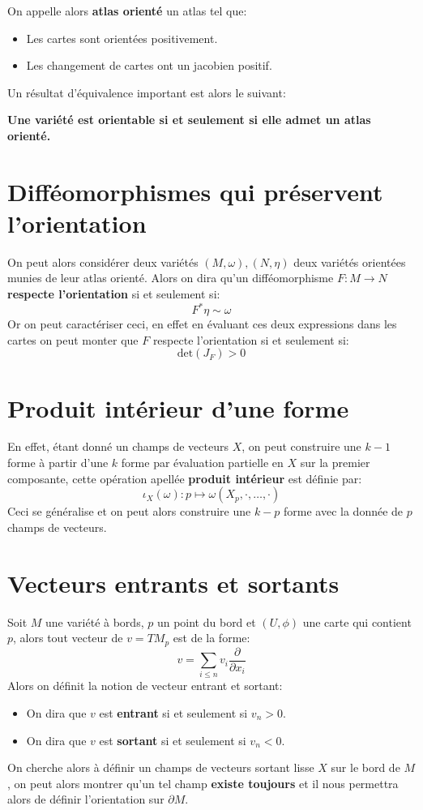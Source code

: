       On appelle alors \textbf{atlas orienté} un atlas tel que:
      \begin{itemize}
         \item Les cartes sont orientées positivement.
         \item Les changement de cartes ont un jacobien positif.
      \end{itemize}
      Un résultat d'équivalence important est alors le suivant:
      \begin{center}
         \textbf{Une variété est orientable si et seulement si elle admet un atlas orienté.}
      \end{center}
   
   
   
   \section{Difféomorphismes qui préservent l'orientation}
      On peut alors considérer deux variétés \( (M, \omega), (N, \eta) \) deux variétés orientées munies de leur atlas orienté. Alors on dira qu'un difféomorphisme \( F : M \longrightarrow N \) \textbf{respecte l'orientation} si et seulement si:
      \[ 
         F^*\eta \sim \omega
      \]
      Or on peut caractériser ceci, en effet en évaluant ces deux expressions dans les cartes on peut monter que \( F \) respecte l'orientation si et seulement si:
      \[ 
         \text{det}(J_F) > 0
      \]
   \section{Produit intérieur d'une forme}
         En effet, étant donné un champs de vecteurs \( X \), on peut construire une \( k-1 \) forme à partir d'une \( k \) forme par évaluation partielle en \( X \) sur la premier composante, cette opération apellée \textbf{produit intérieur} est définie par:
         \[ 
            \iota_X(\omega) : p \mapsto \omega(X_p, \cdot, \ldots, \cdot)
         \]
         Ceci se généralise et on peut alors construire une \( k-p \) forme avec la donnée de \( p \) champs de vecteurs.
   \section{Vecteurs entrants et sortants}
      Soit $M$ une variété à bords, $p$ un point du bord et $(U, \phi)$ une carte qui contient $p$, alors tout vecteur de $v = TM_p$ est de la forme:
      \[ 
         v = \sum_{i \leq n} v_i \frac{\partial}{\partial x_i}
      \]
      Alors on définit la notion de vecteur entrant et sortant:
      \begin{itemize}
         \item On dira que $v$ est \textbf{entrant} si et seulement si $v_n > 0$.
         \item On dira que $v$ est \textbf{sortant} si et seulement si $v_n < 0$. 
      \end{itemize}
      On cherche alors à définir un champs de vecteurs sortant lisse \( X \) sur le bord de \( M \), on peut alors montrer qu'un tel champ \textbf{existe toujours} et il nous permettra alors de définir l'orientation sur \( \partial M \).  
